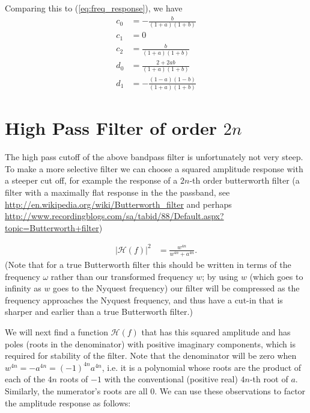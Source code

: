 \documentclass[a4paper]{article}
\begin{document}
Comparing this to (\ref{eq:freq_response}), we have
\begin{align}
c_0 &= -\frac{b}{(1 + a)(1 + b)} \label{eq:c0}\\
c_1 &= 0 \\
c_2 &= \frac{b}{(1 + a)(1 + b)} \\
d_0 &= \frac{2 +2ab}{(1 + a)(1 + b)} \\
d_1 &= -\frac{(1-a)(1-b)}{(1 + a)(1 + b)} \label{eq:d1}
\end{align}

\section[High Pass Filter]{High Pass Filter of order $2 n$}
The high pass cutoff of the above bandpass filter is unfortunately not very
steep.  To make a more selective filter we can choose a squared
amplitude response with a steeper cut off, for example the response of a $2n$-th order butterworth filter (a filter with a maximally flat response in the the passband, see \url{http://en.wikipedia.org/wiki/Butterworth_filter} and perhaps \url{http://www.recordingblogs.com/sa/tabid/88/Default.aspx?topic=Butterworth+filter})

\begin{align}
    |\mathcal{H}(f)|^2 &= \frac{w^{4n}}{w^{4n} + a^{4n}}.
\end{align}
(Note that for a true Butterworth filter this should be written in terms of the frequency $\omega$ rather than our transformed frequency $w$; by using $w$ (which goes to infinity as $w$ goes to the Nyquest frequency) our filter will be compressed as the frequency approaches the Nyquest frequency, and thus have a cut-in that is sharper and earlier than a true Butterworth filter.)

We will next find a function $\mathcal{H}(f)$ that has this squared amplitude
and has poles (roots in the denominator) with positive imaginary components,
which is required for stability of the filter.
Note that the denominator will be zero when $w^{4n} = -a^{4n} = (-1)^{4n}
a^{4n}$, i.e. it is a polynomial whose roots are the product of each of the
$4n$ roots of $-1$ with the conventional (positive real) $4n$-th root of $a$.
Similarly, the numerator's roots are all $0$.  We can use these observations to
factor the amplitude response as follows:
\end{document}
